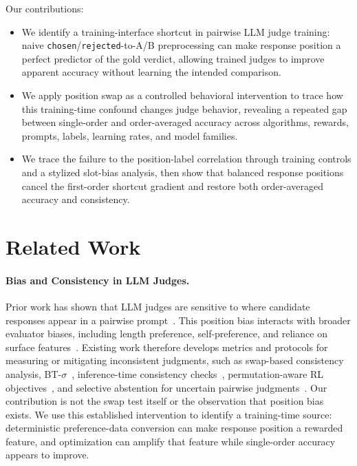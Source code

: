 \documentclass[11pt]{article}
\begin{document}
Our contributions:
\begin{itemize}
\item We identify a training-interface shortcut in pairwise LLM judge training: naive \texttt{chosen}/\texttt{rejected}-to-A/B preprocessing can make response position a perfect predictor of the gold verdict, allowing trained judges to improve apparent accuracy without learning the intended comparison.
\item We apply position swap as a controlled behavioral intervention to trace how this training-time confound changes judge behavior, revealing a repeated gap between single-order and order-averaged accuracy across algorithms, rewards, prompts, labels, learning rates, and model families.
\item We trace the failure to the position-label correlation through training controls and a stylized slot-bias analysis, then show that balanced response positions cancel the first-order shortcut gradient and restore both order-averaged accuracy and consistency.
\end{itemize}

\section{Related Work}

\paragraph{Bias and Consistency in LLM Judges.}
Prior work has shown that LLM judges are sensitive to where candidate responses appear in a pairwise prompt~\citep{zheng2023judging,wang2024largelanguagemodels,zhu2024judgebench}. This position bias interacts with broader evaluator biases, including length preference, self-preference, and reliance on surface features~\citep{wu2024style,koo2024benchmarking,li2024quantifying,park2024disentangling,singhal2024long}. Existing work therefore develops metrics and protocols for measuring or mitigating inconsistent judgments, such as swap-based consistency analysis, BT-$\sigma$~\citep{btsigma2026}, inference-time consistency checks~\citep{trustjudge2026}, permutation-aware RL objectives~\citep{eisgrpo2026,pagrpo2026}, and selective abstention for uncertain pairwise judgments~\citep{scope2026}. Our contribution is not the swap test itself or the observation that position bias exists. We use this established intervention to identify a training-time source: deterministic preference-data conversion can make response position a rewarded feature, and optimization can amplify that feature while single-order accuracy appears to improve.
\end{document}
